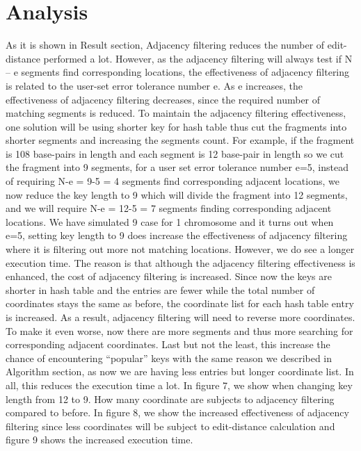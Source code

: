 \section{Analysis} \label{sec:analysis} 

As it is shown in Result section, Adjacency filtering reduces the number of
edit-distance performed a lot.  However, as the adjacency filtering will always
test if N – e segments find corresponding locations, the effectiveness of
adjacency filtering is related to the user-set error tolerance number e. As e
increases, the effectiveness of adjacency filtering decreases, since the
required number of matching segments is reduced. To maintain the adjacency
filtering effectiveness, one solution will be using shorter key for hash table
thus cut the fragments into shorter segments and increasing the segments count.
For example, if the fragment is 108 base-pairs in length and each segment is 12
base-pair in length so we cut the fragment into 9 segments, for a user set
error tolerance number e=5, instead of requiring N-e = 9-5 = 4 segments find
corresponding adjacent locations, we now reduce the key length to 9 which will
divide the fragment into 12 segments, and we will require N-e = 12-5 = 7
segments finding corresponding adjacent locations. We have simulated 9 case for
1 chromosome and it turns out when e=5, setting key length to 9 does increase
the effectiveness of adjacency filtering where it is filtering out more not
matching locations. However, we do see a longer execution time. The reason is
that although the adjacency filtering effectiveness is enhanced, the cost of
adjacency filtering is increased. Since now the keys are shorter in hash table
and the entries are fewer while the total number of coordinates stays the same
as before, the coordinate list for each hash table entry is increased. As a
result, adjacency filtering will need to reverse more coordinates. To make it
even worse, now there are more segments and thus more searching for
corresponding adjacent coordinates. Last but not the least, this increase the
chance of encountering “popular” keys with the same reason we described in
Algorithm section, as now we are having less entries but longer coordinate
list. In all, this reduces the execution time a lot. In figure 7, we show when
changing key length from 12 to 9. How many coordinate are subjects to adjacency
filtering compared to before. In figure 8, we show the increased effectiveness
of adjacency filtering since less coordinates will be subject to edit-distance
calculation and figure 9 shows the increased execution time. \\ 


